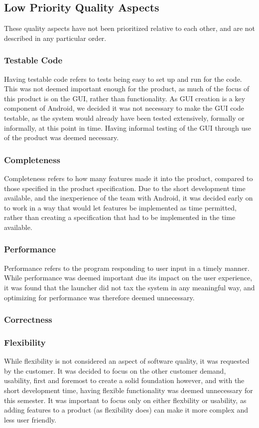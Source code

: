 \subsection{Low Priority Quality Aspects}
These quality aspects have not been prioritized relative to each other, and are not described in any particular order. 

\subsubsection{Testable Code}
Having testable code refers to tests being easy to set up and run for the code. 
This was not deemed important enough for the product, as much of the focus of this product is on the GUI, rather than functionality. 
As GUI creation is a key component of Android, we decided it was not necessary to make the GUI code testable, as the system would already have been tested extensively, formally or informally, at this point in time. 
Having informal testing of the GUI through use of the product was deemed necessary.

\subsubsection{Completeness}
Completeness refers to how many features made it into the product, compared to those specified in the product specification. 
Due to the short development time available, and the inexperience of the team with Android, it was decided early on to work in a way that would let features be implemented as time permitted, rather than creating a specification that had to be implemented in the time available.

\subsubsection{Performance}
Performance refers to the program responding to user input in a timely manner. 
While performance was deemed important due its impact on the user experience, it was found that the launcher did not tax the system in any meaningful way, and optimizing for performance was therefore deemed unnecessary.

\subsubsection{Correctness}

\subsubsection{Flexibility}
While flexibility is not considered an aspect of software quality, it was requested by the customer. 
It was decided to focus on the other customer demand, usability, first and foremost to create a solid foundation however, and with the short development time, having flexible functionality was deemed unnecessary for this semester. 
It was important to focus only on either flexbility or usability, as adding features to a product (as flexibility does) can make it more complex and less user friendly. 